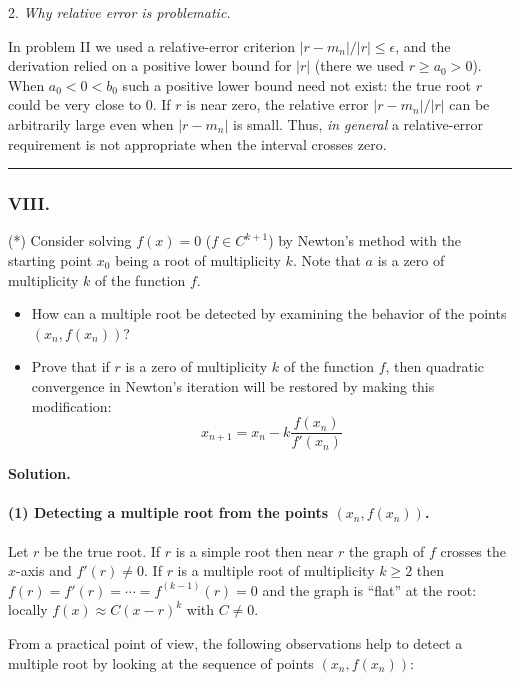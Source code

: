 \documentclass[a4paper]{article}
\begin{document}
2. \emph{Why relative error is problematic.} 

In problem II we used a
relative-error criterion \(|r-m_n|/|r|\le\epsilon\), and the derivation
relied on a positive lower bound for \(|r|\) (there we used \(r\ge a_0>0\)).
When \(a_0<0<b_0\) such a positive lower bound need not exist: the true
root \(r\) could be very close to \(0\). If \(r\) is near zero, the
relative error \(|r-m_n|/|r|\) can be arbitrarily large even when
\(|r-m_n|\) is small. Thus, \emph{in general} a relative-error requirement
is not appropriate when the interval crosses zero.




\noindent\rule{\textwidth}{.4pt}

\subsubsection*{VIII.}
(*) Consider solving $f(x) = 0$ ($f \in C^{k+1}$) by Newton's method with the starting point $x_0$ being a root of multiplicity $k$. Note that $a$ is a zero of multiplicity $k$ of the function $f$.
\begin{itemize}
    \item How can a multiple root be detected by examining the behavior of the points $(x_n, f(x_n))$?
    \item Prove that if $r$ is a zero of multiplicity $k$ of the function $f$, then quadratic convergence in Newton's iteration will be restored by making this modification:
    \[
    x_{n+1} = x_n - k \frac{f(x_n)}{f'(x_n)}
    \]
\end{itemize}

\textbf{Solution.}

\paragraph{(1) Detecting a multiple root from the points $(x_n,f(x_n))$.}
Let $r$ be the true root. If $r$ is a simple root then near $r$ the graph
of $f$ crosses the $x$-axis and $f'(r)\neq0$. If $r$ is a multiple root of
multiplicity $k\ge2$ then $f(r)=f'(r)=\cdots=f^{(k-1)}(r)=0$ and the graph
is ``flat'' at the root: locally $f(x)\approx C(x-r)^k$ with $C\neq0$.

From a practical point of view, the following observations help to detect
a multiple root by looking at the sequence of points $(x_n,f(x_n))$:
\end{document}
